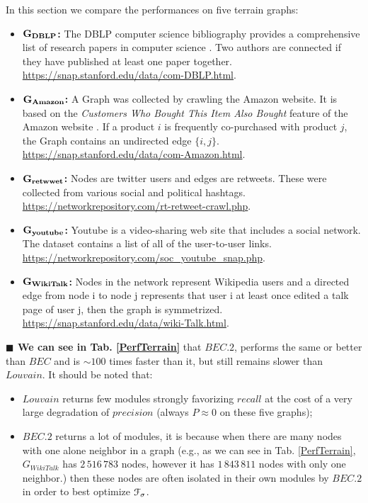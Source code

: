 \documentclass[12pt]{article}
\theoremstyle{thmstyleone}%
\theoremstyle{definition}
\begin{document}
In this section we compare the performances on five terrain graphs:
\begin{itemize}
    \item {\bf $\bf G_{DBLP}$:} The DBLP computer science bibliography provides a comprehensive list of research papers in computer science \cite{snapnets}. Two authors are connected if they have published at least one paper together. \url{https://snap.stanford.edu/data/com-DBLP.html}.
    \item {\bf $\bf G_{Amazon}$:} A Graph was collected by crawling the Amazon website. It is based on the {\it Customers Who Bought This Item Also Bought} feature of the Amazon website \cite{snapnets}. If a product $i$ is frequently co-purchased with product $j$, the Graph contains an undirected edge $\{i,j\}$. \url{https://snap.stanford.edu/data/com-Amazon.html}.
    \item {\bf $\bf G_{retwwet}$:} Nodes are twitter users and edges are retweets. These were collected from various social and political hashtags. \url{https://networkrepository.com/rt-retweet-crawl.php}.
    \item {\bf $\bf G_{youtube}$:} Youtube is a video-sharing web site that includes a social network. The dataset contains a list of all of the user-to-user links. \url{https://networkrepository.com/soc_youtube_snap.php}.
    \item {\bf $\bf G_{WikiTalk}$:} Nodes in the network represent Wikipedia users \cite{Leskovec2010SignedNI} and a directed edge from node i to node j represents that user i at least once edited a talk page of user j, then the graph is symmetrized. \url{https://snap.stanford.edu/data/wiki-Talk.html}.
 \end{itemize}

 \noindent
{\bf $\blacksquare$ We can see in Tab. \ref{PerfTerrain}} that $BEC.2$, performs the same or better than $BEC$ and is $\sim100$ times faster than it, but still remains slower than $Louvain$. It should be noted that:
\begin{itemize}
 \item $Louvain$ returns few modules strongly favorizing $recall$ at the cost of a very large degradation of $precision$ (always $P \approx 0$ on these five graphs);
 \item $BEC.2$ returns a lot of modules, it is because when there are many nodes with one alone neighbor in a graph
 (e.g., as we can see in Tab. \ref{PerfTerrain}, $G_{WikiTalk}$ has $2\,516\,783$ nodes, however it has  $1\,843\, 811$ nodes with only one neighbor.) then these nodes are often isolated in their own modules by $BEC.2$ in order to best optimize $\EuScript{F}_{\sigma}$.
\end{itemize}
\end{document}
